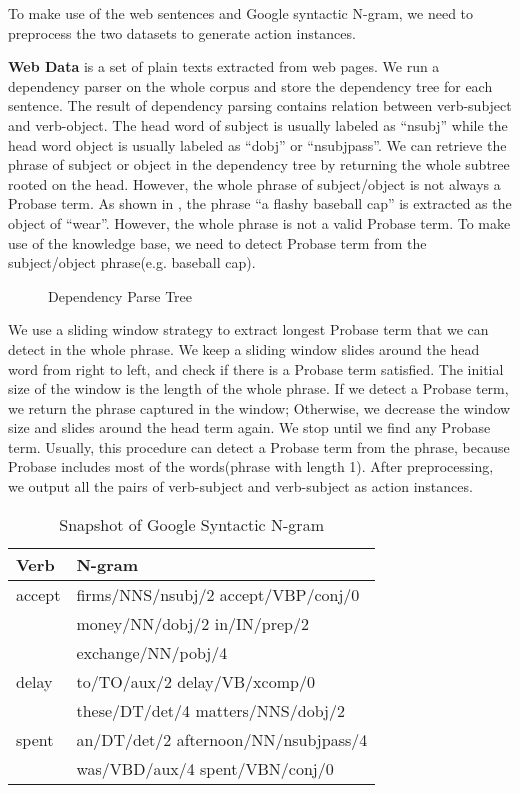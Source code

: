To make use of the web sentences and Google syntactic N-gram,
we need to preprocess the two datasets to generate action instances.

\textbf{Web Data} is a set of plain texts extracted from web pages.
We run a dependency parser on the whole corpus and
store the dependency tree for each sentence. The result of
dependency parsing contains relation between verb-subject and
verb-object. The head word of subject is usually labeled
as ``nsubj'' while the head word object is usually
labeled as ``dobj'' or ``nsubjpass''.
We can retrieve the phrase of subject or object in the dependency
tree by returning the whole subtree rooted on the head.
However, the whole phrase of subject/object is not always
a Probase term. As shown in ,
the phrase ``a flashy baseball cap''
is extracted as the object of ``wear''. However,
the whole phrase is not a valid Probase term.
To make use of the knowledge base, we need to
detect Probase term from the subject/object phrase(e.g. baseball cap).

\begin{figure}[th]
\centering
{}
\caption{Dependency Parse Tree}
\label{fig:pterm}
\end{figure}

We use a sliding window strategy to extract longest
Probase term that we can detect in the whole phrase.
We keep a sliding window slides around the head word
from right to left,
and check if there is a Probase term satisfied.
The initial size of the window is the length of the
whole phrase. If we detect a Probase term,
we return the phrase captured in the window;
Otherwise, we decrease the window size and slides
around the head term again. We stop until we find
any Probase term. Usually, this procedure can detect
a Probase term from the phrase, because Probase includes
most of the words(phrase with length 1). After
preprocessing, we output all the pairs of verb-subject and
verb-subject as action instances.

\begin{table}[th]
\centering
\caption{Snapshot of Google Syntactic N-gram}
\begin{tabular}{|l|l|}
\hline
Verb & N-gram \\
\hline \hline
accept & firms/NNS/nsubj/2\; accept/VBP/conj/0\; \\
& money/NN/dobj/2\; in/IN/prep/2\; \\
& exchange/NN/pobj/4   \\
\hline
delay & to/TO/aux/2\; delay/VB/xcomp/0\; \\
& these/DT/det/4\; matters/NNS/dobj/2 \\
\hline
spent & an/DT/det/2\; afternoon/NN/nsubjpass/4\; \\
& was/VBD/aux/4\; spent/VBN/conj/0\\
\hline
\end{tabular}
\label{tab:ngram}
\end{table}

